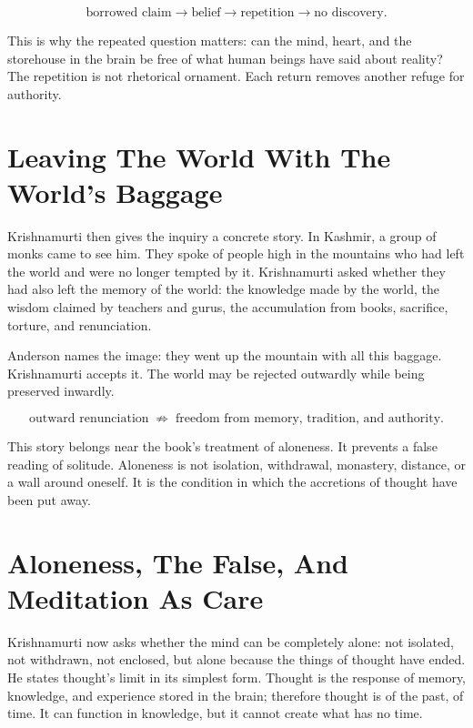 \documentclass[11pt,oneside]{book}
\begin{document}
\begin{equation}
\text{borrowed claim}
\longrightarrow
\text{belief}
\longrightarrow
\text{repetition}
\longrightarrow
\text{no discovery}.
\end{equation}

This is why the repeated question matters: can the mind, heart, and the storehouse in the brain be free of what human beings have said about reality? The repetition is not rhetorical ornament. Each return removes another refuge for authority.

\section{Leaving The World With The World's Baggage}

Krishnamurti then gives the inquiry a concrete story. In Kashmir, a group of monks came to see him. They spoke of people high in the mountains who had left the world and were no longer tempted by it. Krishnamurti asked whether they had also left the memory of the world: the knowledge made by the world, the wisdom claimed by teachers and gurus, the accumulation from books, sacrifice, torture, and renunciation.

Anderson names the image: they went up the mountain with all this baggage. Krishnamurti accepts it. The world may be rejected outwardly while being preserved inwardly.

\begin{equation}
\text{outward renunciation}
\;\not\Rightarrow\;
\text{freedom from memory, tradition, and authority}.
\end{equation}

This story belongs near the book's treatment of aloneness. It prevents a false reading of solitude. Aloneness is not isolation, withdrawal, monastery, distance, or a wall around oneself. It is the condition in which the accretions of thought have been put away.

\section{Aloneness, The False, And Meditation As Care}

Krishnamurti now asks whether the mind can be completely alone: not isolated, not withdrawn, not enclosed, but alone because the things of thought have ended. He states thought's limit in its simplest form. Thought is the response of memory, knowledge, and experience stored in the brain; therefore thought is of the past, of time. It can function in knowledge, but it cannot create what has no time.
\end{document}

